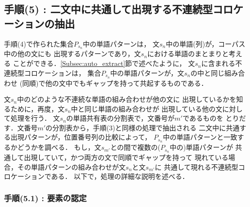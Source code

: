 \subsection*{手順(5) : 二文中に共通して出現する不連続型コロケーションの抽出}

手順(4)で作られた集合\hspace{-0.1mm}$P_{s_n}$\hspace{-0.1mm}中の単語パターンは，
文\hspace{-0.1mm}$s_n$\hspace{-0.1mm}中の単語(列)が，コーパス中の他の文にも
出現するパターンであり，文$s_n$における単語のまとまりと考える
ことができる．\ref{Subsec:auto_extract}節で述べたように，
文\hspace{-0.1mm}$s_n$\hspace{-0.1mm}に含まれる不連続型コロケーションは，
集合$P_{s_n}$中の単語パターンが，文\hspace{-0.1mm}$s_n$\hspace{-0.1mm}の中と同じ組み合わせ
(同順)で他の文中でもギャップを持って共起するものである．

文\hspace{-0.1mm}$s_n$\hspace{-0.1mm}中のどのような不連続な単語の組み合わせが他の文に
出現しているかを知るために，再度，文\hspace{-0.1mm}$s_n$\hspace{-0.1mm}中と同じ単語の組み合わせが
出現している他の文に対して処理を行う．
文\hspace{-0.1mm}$s_n$\hspace{-0.1mm}の単語共有表の分割表で，文番号が\hspace{-0.1mm}$m'$\hspace{-0.1mm}であるものを
とりだす．文番号\hspace{-0.1mm}$m'$\hspace{-0.1mm}の分割表から，手順(3)と同様の処理で抽出される
二文中に共通する出現パターンが，位置番号列の比較によって，
$P_{s_n}$中の単語パターンと一致するかどうかを調べる．
もし，文$s_{m'}$との間で複数の($P_{s_n}$中の)単語パターンが
共通して出現していて，かつ両方の文で同順でギャップを持って
現れている場合，その単語パターンの組み合わせが文\hspace{-0.1mm}$s_n$\hspace{-0.1mm}と文$s_{m'}$に
共通して現れる不連続型コロケーションである．
以下で，処理の詳細な説明を述べる．

\subsubsection*{手順(5.1) : 要素の認定}

